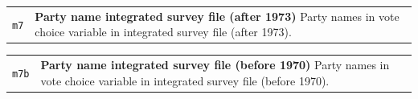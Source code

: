 \documentclass[
]{scrartcl}
\begin{document}
\begin{longtable}{p{3.2cm}| p{11cm}}
\texttt{m7} &\textbf{Party name integrated survey file (after 1973)}\newline 
Party names in vote choice variable in integrated survey file (after 1973).
\end{longtable}

\begin{longtable}{p{3.2cm}| p{11cm}}
\texttt{m7b} &\textbf{Party name integrated survey file (before 1970)}\newline 
Party names in vote choice variable in integrated survey file (before 1970).
\end{longtable}

\newpage

\printbibliography[title=References]
\end{document}
